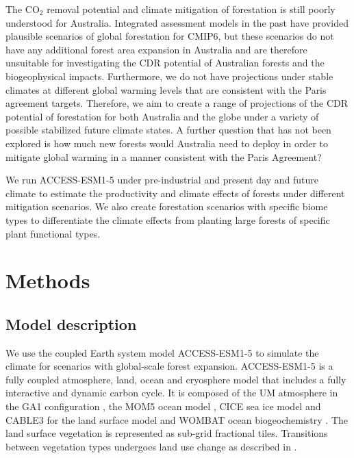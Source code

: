 \documentclass[]{article}
\begin{document}
The CO$_2$ removal potential and climate mitigation of forestation is still poorly understood for Australia.
Integrated assessment models in the past have provided plausible scenarios of global forestation for CMIP6, but these scenarios do not have any additional forest area expansion in Australia \parencite{loughran_limited_2023} and are therefore unsuitable for investigating the CDR potential of Australian forests and the biogeophysical impacts.
Furthermore, we do not have projections under stable climates at different global warming levels that are consistent with the Paris agreement targets.
Therefore, we aim to create a range of projections of the CDR potential of forestation for both Australia and the globe under a variety of possible stabilized future climate states.
A further question that has not been explored is how much new forests would Australia need to deploy in order to mitigate global warming in a manner consistent with the Paris Agreement?

We run ACCESS-ESM1-5 under pre-industrial and present day and future climate to estimate the productivity and climate effects of forests under different mitigation scenarios.
We also create forestation scenarios with specific biome types to differentiate the climate effects from planting large forests of specific plant functional types.

\section{Methods}

\subsection{Model description}

We use the coupled Earth system model ACCESS-ESM1-5 to simulate the climate for scenarios with global-scale forest expansion.
ACCESS-ESM1-5 is a fully coupled atmosphere, land, ocean and cryosphere model that includes a fully interactive and dynamic carbon cycle.
It is composed of the UM atmosphere in the GA1 configuration \parencite{martin_analysis_2010}, the MOM5 ocean model \parencite{griffies_elements_2012}, CICE sea ice model \parencite{hunke_cice_2008} and CABLE3 for the land surface model and WOMBAT ocean biogeochemistry \parencite{law_carbon_2017}.
The land surface vegetation is represented as sub-grid fractional tiles.
Transitions between vegetation types undergoes land use change as described in \cite{ziehn_australian_2020}.
\end{document}
